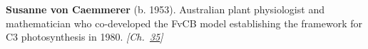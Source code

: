 \textbf{Susanne von Caemmerer} (b. 1953). Australian plant physiologist and mathematician who co-developed the FvCB model establishing the framework for C3 photosynthesis in 1980. \emph{[Ch.~\hyperref[ch:treesfromair]{35}]}

